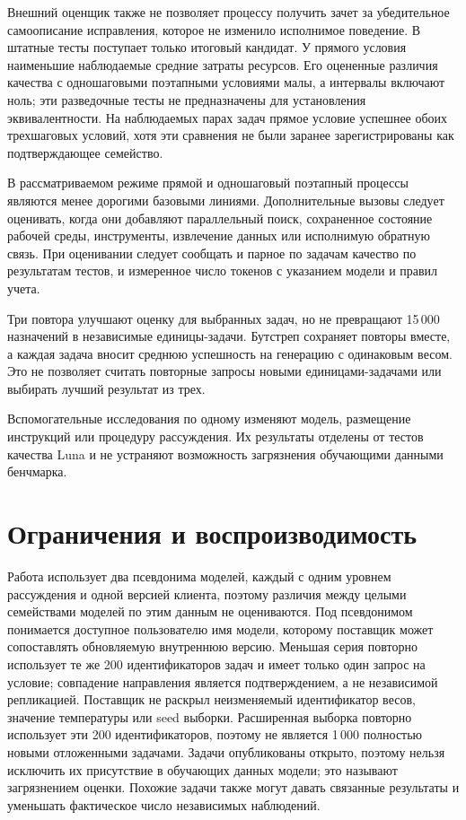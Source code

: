 Внешний оценщик также не позволяет процессу получить зачет за убедительное самоописание исправления, которое не изменило исполнимое поведение. В штатные тесты поступает только итоговый кандидат. У прямого условия наименьшие наблюдаемые средние затраты ресурсов. Его оцененные различия качества с одношаговыми поэтапными условиями малы, а интервалы включают ноль; эти разведочные тесты не предназначены для установления эквивалентности. На наблюдаемых парах задач прямое условие успешнее обоих трехшаговых условий, хотя эти сравнения не были заранее зарегистрированы как подтверждающее семейство.

В рассматриваемом режиме прямой и одношаговый поэтапный процессы являются менее дорогими базовыми линиями. Дополнительные вызовы следует оценивать, когда они добавляют параллельный поиск, сохраненное состояние рабочей среды, инструменты, извлечение данных или исполнимую обратную связь. При оценивании следует сообщать и парное по задачам качество по результатам тестов, и измеренное число токенов с указанием модели и правил учета.

Три повтора улучшают оценку для выбранных задач, но не превращают 15\,000 назначений в независимые единицы-задачи. Бутстреп сохраняет повторы вместе, а каждая задача вносит среднюю успешность на генерацию с одинаковым весом. Это не позволяет считать повторные запросы новыми единицами-задачами или выбирать лучший результат из трех.

Вспомогательные исследования по одному изменяют модель, размещение инструкций или процедуру рассуждения. Их результаты отделены от тестов качества Luna и не устраняют возможность загрязнения обучающими данными бенчмарка.

\FloatBarrier
\section{Ограничения и воспроизводимость}
Работа использует два псевдонима моделей, каждый с одним уровнем рассуждения и одной версией клиента, поэтому различия между целыми семействами моделей по этим данным не оцениваются. Под псевдонимом понимается доступное пользователю имя модели, которому поставщик может сопоставлять обновляемую внутреннюю версию. Меньшая серия повторно использует те же 200 идентификаторов задач и имеет только один запрос на условие; совпадение направления является подтверждением, а не независимой репликацией. Поставщик не раскрыл неизменяемый идентификатор весов, значение температуры или seed выборки. Расширенная выборка повторно использует эти 200 идентификаторов, поэтому не является 1\,000 полностью новыми отложенными задачами. Задачи опубликованы открыто, поэтому нельзя исключить их присутствие в обучающих данных модели; это называют загрязнением оценки. Похожие задачи также могут давать связанные результаты и уменьшать фактическое число независимых наблюдений.

